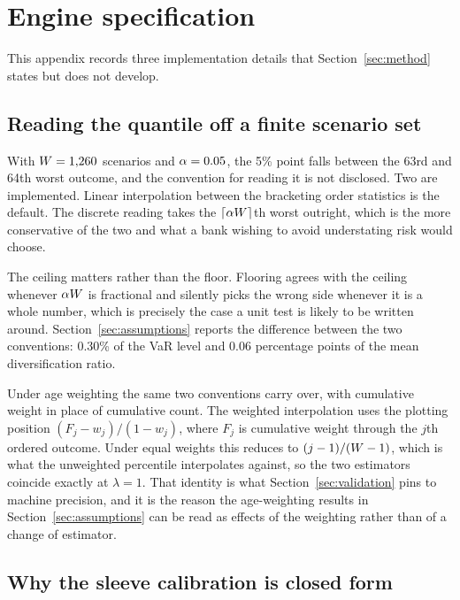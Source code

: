 
\section{Engine specification}\label{sec:appendix_b}

This appendix records three implementation details that Section~\ref{sec:method}
states but does not develop.

\subsection*{Reading the quantile off a finite scenario set}

With $W = 1{,}260$ scenarios and $\alpha = 0.05$, the 5\% point falls
between the 63rd and 64th worst outcome, and the convention for reading it is
not disclosed. Two are implemented. Linear interpolation between the bracketing
order statistics is the default. The discrete reading takes the $\lceil \alpha
W \rceil$th worst outright, which is the more conservative of the two and
what a bank wishing to avoid understating risk would choose.

The ceiling matters rather than the floor. Flooring agrees with the ceiling
whenever $\alpha W$ is fractional and silently picks the wrong side
whenever it is a whole number, which is precisely the case a unit test is
likely to be written around. Section~\ref{sec:assumptions} reports the
difference between the two conventions: 0.30\% of the VaR level and 0.06
percentage points of the mean diversification ratio.

Under age weighting the same two conventions carry over, with cumulative weight
in place of cumulative count. The weighted interpolation uses the plotting
position $(F_{j} - w_{j}) / (1 - w_{j})$, where $F_{j}$ is cumulative weight
through the $j$th ordered outcome. Under equal weights this reduces to
$(j-1)/(W-1)$, which is what the unweighted percentile interpolates
against, so the two estimators coincide exactly at $\lambda = 1$. That identity
is what Section~\ref{sec:validation} pins to machine precision, and it is the
reason the age-weighting results in Section~\ref{sec:assumptions} can be read
as effects of the weighting rather than of a change of estimator.

\subsection*{Why the sleeve calibration is closed form}

